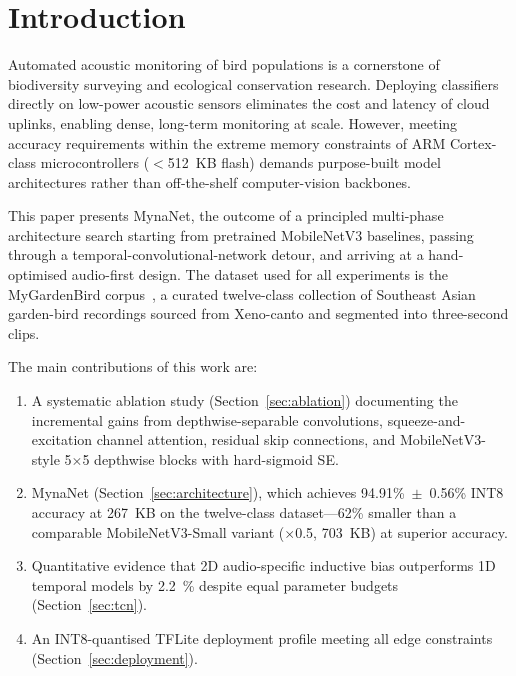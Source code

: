 \documentclass[final,5p,times,twocolumn,nolinenum]{elsarticle}
\begin{document}
\linenumbers

\section{Introduction}
\label{sec:introduction}

Automated acoustic monitoring of bird populations is a cornerstone of
biodiversity surveying and ecological conservation research. Deploying
classifiers directly on low-power acoustic sensors eliminates the cost and
latency of cloud uplinks, enabling dense, long-term monitoring at scale.
However, meeting accuracy requirements within the extreme memory constraints
of ARM Cortex-class microcontrollers ($<$\SI{512}{KB} flash) demands
purpose-built model architectures rather than off-the-shelf computer-vision
backbones.

This paper presents MynaNet, the outcome of a principled multi-phase
architecture search starting from pretrained MobileNetV3 baselines, passing
through a temporal-convolutional-network detour, and arriving at a
hand-optimised audio-first design. The dataset used for all experiments is
the MyGardenBird corpus~\cite{zabidi2026mygardenbird}, a curated twelve-class
collection of Southeast Asian garden-bird recordings sourced from Xeno-canto
and segmented into three-second clips.

The main contributions of this work are:
\begin{enumerate}
  \item A systematic ablation study (Section~\ref{sec:ablation}) documenting
        the incremental gains from depthwise-separable convolutions,
        squeeze-and-excitation channel attention, residual skip connections,
        and MobileNetV3-style 5$\times$5 depthwise blocks with hard-sigmoid SE.
  \item MynaNet (Section~\ref{sec:architecture}), which achieves
        94.91\%~$\pm$~0.56\% INT8 accuracy at 267~KB on the twelve-class
        dataset---62\% smaller than a comparable MobileNetV3-Small variant
        ($\times$0.5, 703~KB) at superior accuracy.
  \item Quantitative evidence that 2D audio-specific inductive bias
        outperforms 1D temporal models by \SI{2.2}{\percent} despite equal
        parameter budgets (Section~\ref{sec:tcn}).
  \item An INT8-quantised TFLite deployment profile meeting all edge
        constraints (Section~\ref{sec:deployment}).
\end{enumerate}
\end{document}
